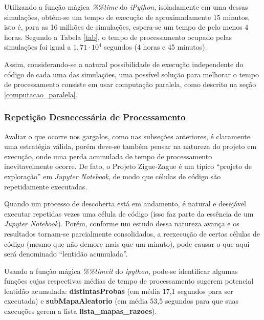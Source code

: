 \documentclass[12pt]{article}
\newcommand{\aspas}[1]{``#1''} %
\begin{document}
Utilizando a função mágica \textit{\%\%time} do \textit{iPython}, isoladamente em uma dessas simulações, obtém-se um tempo de execução de aproximadamente 15 minutos, isto é, para as 16 milhões de simulações, espera-se um tempo de pelo menos 4 horas. Segundo a Tabela \ref{tab}, o tempo de processamento ocupado pelas simulações foi igual a $1,71 \cdot 10^4$ segundos (4 horas e 45 minutos). 

Assim, considerando-se a natural possibilidade de execução independente do código de cada uma das simulações, uma possível solução para melhorar o tempo de processamento consiste em usar computação paralela, como descrito na seção \ref{computacao_paralela}.

\subsubsection{Repetição Desnecessária de Processamento}
\label{repeticao}


Avaliar o que ocorre nos gargalos, como nas subseções anteriores, é claramente uma estratégia válida, porém deve-se também pensar na natureza do projeto em execução, onde uma perda acumulada de tempo de processamento inevitavelmente ocorre. De fato, o Projeto Zigue-Zague é um típico \aspas{projeto de exploração} em \textit{Jupyter Notebook}, de modo que células de código são repetidamente executadas.

Quando um processo de descoberta está em andamento, é natural e desejável executar repetidas vezes uma célula de código (isso faz parte da essência de um \textit{Jupyter Notebook}). Porém, conforme um estudo dessa natureza avança e os resultados tornam-se parcialmente consolidados, a reexecução de certas células de código (mesmo que não demore mais que um minuto), pode causar o que aqui será denominado \aspas{lentidão acumulada}.

Usando a função mágica \textit{\%\%timeit} do \textit{ipython}, pode-se identificar algumas funções cujas respectivas médias de tempo de processamento sugerem potencial lentidão acumulada: \textbf{distintasProbas} (em média 17,1 segundos para ser executada) e \textbf{subMapaAleatorio} (em média 53,5 segundos para que suas execuções gerem a lista \textbf{lista\_mapas\_razoes}).
\end{document}

